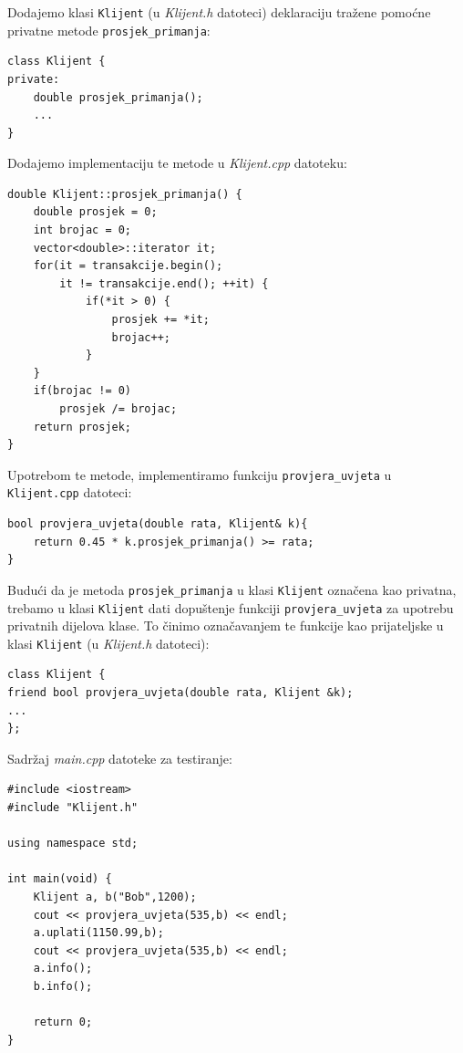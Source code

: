 \begin{rjesenje}
Dodajemo klasi \texttt{Klijent}
(u \textit{Klijent.h} datoteci) deklaraciju tražene pomoćne privatne metode \texttt{prosjek\_primanja}:

\begin{verbatim}
class Klijent {
private:
    double prosjek_primanja();
    ...
}
\end{verbatim}

Dodajemo implementaciju te metode u \textit{Klijent.cpp} datoteku:

\begin{verbatim}
double Klijent::prosjek_primanja() {
    double prosjek = 0;
    int brojac = 0;
    vector<double>::iterator it;
    for(it = transakcije.begin(); 
        it != transakcije.end(); ++it) {
            if(*it > 0) {
                prosjek += *it;
                brojac++;
            }
    }
    if(brojac != 0)
        prosjek /= brojac;
    return prosjek;
}
\end{verbatim}

Upotrebom te metode, implementiramo funkciju \texttt{provjera\_uvjeta}
u \texttt{Klijent.cpp} datoteci:

\begin{verbatim}
bool provjera_uvjeta(double rata, Klijent& k){
    return 0.45 * k.prosjek_primanja() >= rata;
}
\end{verbatim}    

Budući da je metoda \texttt{prosjek\_primanja}
u klasi \texttt{Klijent} označena kao privatna,
trebamo u klasi \texttt{Klijent} dati dopuštenje 
funkciji \texttt{provjera\_uvjeta}
za upotrebu privatnih dijelova klase.
To činimo označavanjem te funkcije kao prijateljske u klasi \texttt{Klijent}
(u \textit{Klijent.h} datoteci):

\begin{verbatim}
class Klijent {
friend bool provjera_uvjeta(double rata, Klijent &k);
...
};
\end{verbatim}

Sadržaj \textit{main.cpp} datoteke za testiranje:

\begin{verbatim}
#include <iostream>
#include "Klijent.h"

using namespace std;

int main(void) {
	Klijent a, b("Bob",1200);
	cout << provjera_uvjeta(535,b) << endl;
	a.uplati(1150.99,b);
	cout << provjera_uvjeta(535,b) << endl;
	a.info();
	b.info();
	
	return 0;
}
\end{verbatim}
\end{rjesenje}


